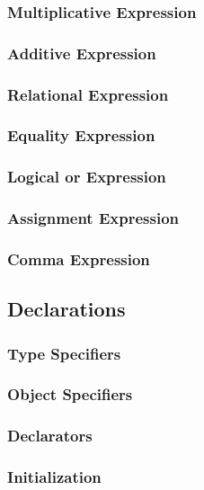 \documentclass[12pt]{report}
\begin{document}
\subsubsection{Multiplicative Expression}
\subsubsection{Additive Expression}
\subsubsection{Relational Expression}
\subsubsection{Equality Expression}
\subsubsection{Logical or Expression}
\subsubsection{Assignment Expression}
\subsubsection{Comma Expression}

\subsection{Declarations}

\subsubsection{Type Specifiers}
\subsubsection{Object Specifiers}
\subsubsection{Declarators}
\subsubsection{Initialization}

\begin{doublespace}
\end{doublespace}
\end{document}
